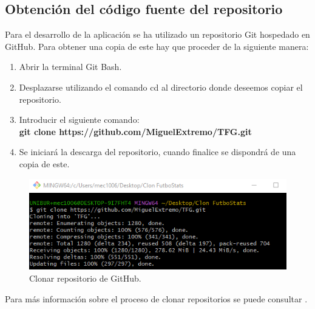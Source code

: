 \subsection{Obtención del código fuente del repositorio}
Para el desarrollo de la aplicación se ha utilizado un repositorio Git hospedado en GitHub. Para obtener una copia de este hay que proceder de la siguiente manera:
\begin{enumerate}
    \item Abrir la terminal Git Bash.
    \item Desplazarse utilizando el comando cd al directorio donde deseemos copiar el repositorio.
    \item Introducir el siguiente comando: \\
    \textbf{git clone https://github.com/MiguelExtremo/TFG.git}
    \item Se iniciará la descarga del repositorio, cuando finalice se dispondrá de una copia de este.
\end{enumerate}

\begin{figure}[H]
    \centering
    \includegraphics[width=0.75\linewidth]{img/clonarRepo.png}
    \caption{Clonar repositorio de GitHub.}
    \label{fig:enter-label}
\end{figure}
Para más información sobre el proceso de clonar repositorios se puede consultar \cite{clonar:latex}.

